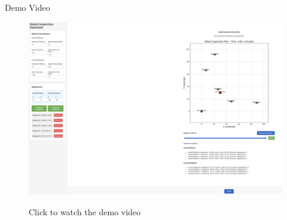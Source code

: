 \documentclass[aspectratio=169,11pt,xcolor={dvipsnames},hyperref={pdftex,pdfpagemode=UseNone,hidelinks,pdfdisplaydoctitle=true},usepdftitle=false]{beamer}
\begin{document}
  
    \begin{frame}{Demo Video}
    \centering
    \begin{figure}
      \centering
      \href{https://www.youtube-nocookie.com/embed/rC7g-lJ-lPA?playlist=rC7g-lJ-lPA&autoplay=1&iv_load_policy=3&loop=1&start=}{
        \includegraphics[width=0.7\linewidth]{figures/insp.pdf}
      }
      \caption{Click to watch the demo video}
    \end{figure}
  \end{frame}
    
    \lastslide
\end{document}
